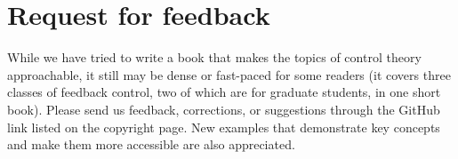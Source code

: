 \section{Request for feedback}

While we have tried to write a book that makes the topics of control theory
approachable, it still may be dense or fast-paced for some readers (it covers
three classes of feedback control, two of which are for graduate students, in
one short book). Please send us feedback, corrections, or suggestions through
the GitHub link listed on the copyright page. New examples that demonstrate key
concepts and make them more accessible are also appreciated.
